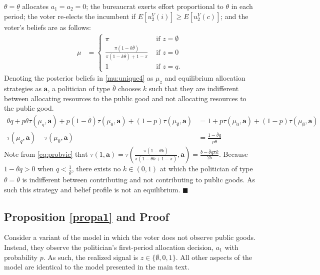 \documentclass[11pt,english]{article}
\begin{document}
$\theta = \underline{\theta}$ allocates $a_1 = a_2 = 0$; the bureaucrat exerts effort proportional to $\theta$ in each period; the voter re-elects the incumbent if $E[u_2^V(i)] \geq E[u_2^V(c)]$; and the voter's beliefs are as follows: 
\begin{align}\label{mu:unique4}
\mu &= \begin{cases}
\pi & \text{ if }z = \emptyset\\
\frac{\pi(1-k \overline{\theta})}{\pi(1-k \overline{\theta}) + 1-\pi} & \text{ if }z = 0\\
1 & \text{ if } z= q.
\end{cases}
\end{align}
Denoting the posterior beliefs in \eqref{mu:unique4} as $\mu_z$ and equilibrium allocation strategies as $\textbf{a}$, a politician of type $\overline{\theta}$ chooses $k$ such that they are indifferent between allocating resources to the public good and not allocating resources to the public good. 
\begin{align*}
\overline{\theta}q + p\overline{\theta}\tau(\mu_q, \boldsymbol{a}) + p(1-\overline{\theta})\tau(\mu_0, \boldsymbol{a})+(1-p)\tau(\mu_\emptyset,\boldsymbol{a})&= 1+ p\tau(\mu_0, \boldsymbol{a}) + (1-p)\tau(\mu_\emptyset, \boldsymbol{a})\\
\tau(\mu_q, \boldsymbol{a})- \tau(\mu_0, \boldsymbol{a}) &= \frac{1-\overline{\theta}q}{p\overline{\theta}}
\end{align*}
Note from \eqref{eq:probvic} that $\tau(1, \boldsymbol{a}) = \tau(\frac{\pi(1-\overline{\theta}k)}{\pi(1-\overline{\theta}k + 1 - \pi)}, \boldsymbol{a}) = \frac{b - \overline{\theta} q \pi k}{2b}$. Because $1-\overline{\theta}q > 0$ when $q < \frac{1}{\overline{\theta}}$, there exists no $k \in (0,1)$ at which the politician of type $\theta = \overline{\theta}$ is indifferent between contributing and not contributing to public goods. As such this strategy and belief profile is not an equilibrium. \hspace{.5cm}$\blacksquare$


\subsection{Proposition \ref{propa1} and Proof}

Consider a variant of the model in which the voter does not observe public goods. Instead, they observe the politician's first-period allocation decision, $a_1$ with probability $p$. As such, the realized signal is $z \in \{\emptyset, 0, 1\}$. All other aspects of the model are identical to the model presented in the main text. 
\end{document}
